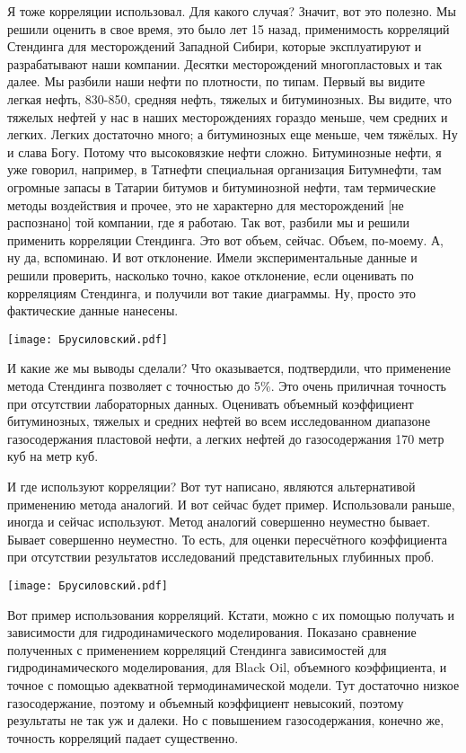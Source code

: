\documentclass[main.tex]{subfiles}
\begin{document}
Я тоже корреляции использовал.
Для какого случая?
Значит, вот это полезно.
Мы решили оценить в свое время, это было лет 15 назад, применимость корреляций Стендинга для месторождений Западной Сибири, которые эксплуатируют и разрабатывают наши компании.
Десятки месторождений многопластовых и так далее.
Мы разбили наши нефти по плотности, по типам.
Первый вы видите легкая нефть, 830-850, средняя нефть, тяжелых и битуминозных.
Вы видите, что тяжелых нефтей у нас в наших месторождениях гораздо меньше, чем средних и легких.
Легких достаточно много; а битуминозных еще меньше, чем тяжёлых.
Ну и слава Богу.
Потому что высоковязкие нефти сложно.
Битуминозные нефти, я уже говорил, например, в Татнефти специальная организация Битумнефти, там огромные запасы в Татарии битумов и битуминозной нефти, там термические методы воздействия и прочее, это не характерно для месторождений [не распознано] той компании, где я работаю.
Так вот, разбили мы и решили применить корреляции Стендинга.
Это вот объем, сейчас.
Объем, по-моему.
А, ну да, вспоминаю.
И вот отклонение.
Имели экспериментальные данные и решили проверить, насколько точно, какое отклонение, если оценивать по корреляциям Стендинга, и получили вот такие диаграммы.
Ну, просто это фактические данные нанесены.

\begin{center}
\texttt{[image: Брусиловский.pdf]}
\end{center}

И какие же мы выводы сделали?
Что оказывается, подтвердили, что применение метода Стендинга позволяет с точностью до 5\%.
Это очень приличная точность при отсутствии лабораторных данных.
Оценивать объемный коэффициент битуминозных, тяжелых и средних нефтей во всем исследованном диапазоне газосодержания пластовой нефти, а легких нефтей до газосодержания 170 метр куб на метр куб.

И где используют корреляции?
Вот тут написано, являются альтернативой применению метода аналогий.
И вот сейчас будет пример.
Использовали раньше, иногда и сейчас используют.
Метод аналогий совершенно неуместно бывает.
Бывает совершенно неуместно.
То есть, для оценки пересчётного коэффициента при отсутствии результатов исследований представительных глубинных проб.

\begin{center}
\texttt{[image: Брусиловский.pdf]}
\end{center}

Вот пример использования корреляций.
Кстати, можно с их помощью получать и зависимости для гидродинамического моделирования.
Показано сравнение полученных с применением корреляций Стендинга зависимостей для гидродинамического моделирования, для Black Oil, объемного коэффициента, и точное с помощью адекватной термодинамической модели.
Тут достаточно низкое газосодержание, поэтому и объемный коэффициент невысокий, поэтому результаты не так уж и далеки.
Но с повышением газосодержания, конечно же, точность корреляций падает существенно.
\end{document}
